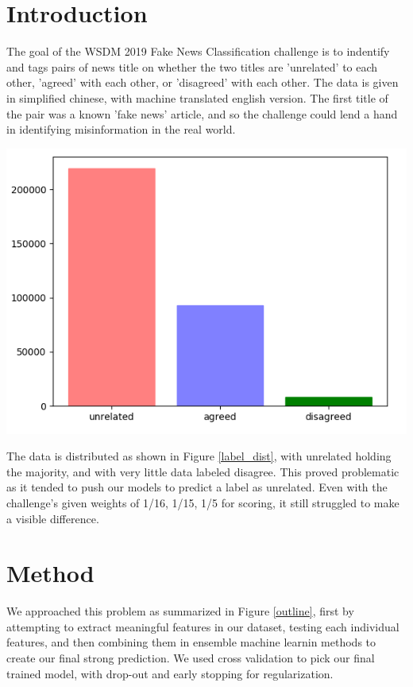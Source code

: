 \documentclass[a4paper, 12pt]{article}
\begin{document}
    \begin{multicols}{2}
        \section{Introduction}
            The goal of the WSDM 2019 Fake News Classification \cite{wsdm} challenge is to indentify and tags pairs of news title on whether the two titles are 'unrelated' to each other, 'agreed' with each other, or 'disagreed' with each other. The data is given in simplified chinese, with machine translated english version. The first title of the pair was a known 'fake news' article, and so the challenge could lend a hand in identifying misinformation in the real world.

            \begin{center}
                \includegraphics[width=\linewidth]{images/label_dist.png}
                \label{label_dist}
            \end{center}
            \vskip 0.2cm

            The data is distributed as shown in Figure \ref{label_dist}, with unrelated holding the majority, and with very little data labeled disagree. This proved problematic as it tended to push our models to predict a label as unrelated. Even with the challenge's given weights of 1/16, 1/15, 1/5 for scoring, it still struggled to make a visible difference.

        \section{Method}
            We approached this problem as summarized in Figure \ref{outline}, first by attempting to extract meaningful features in our dataset, testing each individual features, and then combining them in ensemble machine learnin methods to create our final strong prediction. We used cross validation to pick our final trained model, with drop-out and early stopping for regularization.
        

\end{multicols}
\end{document}
